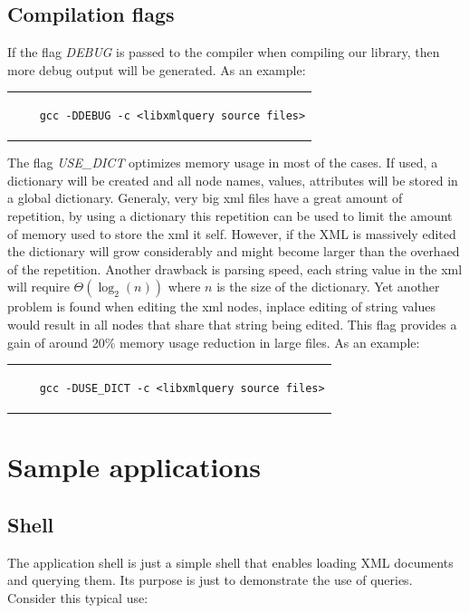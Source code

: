 \documentclass[a4paper]{report}
\begin{document}
	\section{Compilation flags}
		If the flag \emph{DEBUG} is passed to the compiler when compiling our library, then more debug output will be generated. As an example:

	\begin{center}
	\lstset{language=bash,caption=Compiling libxmlquery with debug output, captionpos=b}
	\begin{tabular}{c}
	\begin{lstlisting}
	gcc -DDEBUG -c <libxmlquery source files>
	\end{lstlisting}
	\end{tabular}
	\end{center}

		The flag \emph{USE\_DICT} optimizes memory usage in most of the cases. If used, a dictionary will be created and all node names, values, attributes will be stored in a global dictionary. Generaly, very big xml files have a great amount of repetition, by using a dictionary this repetition can be used to limit the amount of memory used to store the xml it self. However, if the XML is massively edited the dictionary will grow considerably and might become larger than the overhaed of the repetition. Another drawback is parsing speed, each string value in the xml will require $\Theta(\log_2(n))$ where $n$ is the size of the dictionary. Yet another problem is found when editing the xml nodes, inplace editing of string values would result in all nodes that share that string being edited. This flag provides a gain of around 20\% memory usage reduction in large files. As an example:

	\begin{center}
	\lstset{language=bash,caption=Compiling libxmlquery with dictionary optimization, captionpos=b}
	\begin{tabular}{c}
	\begin{lstlisting}
	gcc -DUSE_DICT -c <libxmlquery source files>
	\end{lstlisting}
	\end{tabular}
	\end{center}


\chapter{Sample applications}\label{chap:app} %
	\section{Shell}
		The application shell is just a simple shell that enables loading XML documents and querying them. Its purpose is just to demonstrate the use of queries. Consider this typical use:
\end{document}
